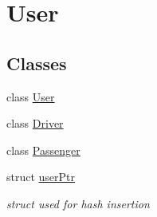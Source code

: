 \hypertarget{group___user}{}\section{User}
\label{group___user}
\subsection*{Classes}
\begin{DoxyCompactItemize}
\item 
class \hyperlink{class_user}{User}
\item 
class \hyperlink{class_driver}{Driver}
\item 
class \hyperlink{class_passenger}{Passenger}
\item 
struct \hyperlink{structuser_ptr}{user\+Ptr}
\begin{DoxyCompactList}\small\item\em struct used for hash insertion \end{DoxyCompactList}\end{DoxyCompactItemize}
